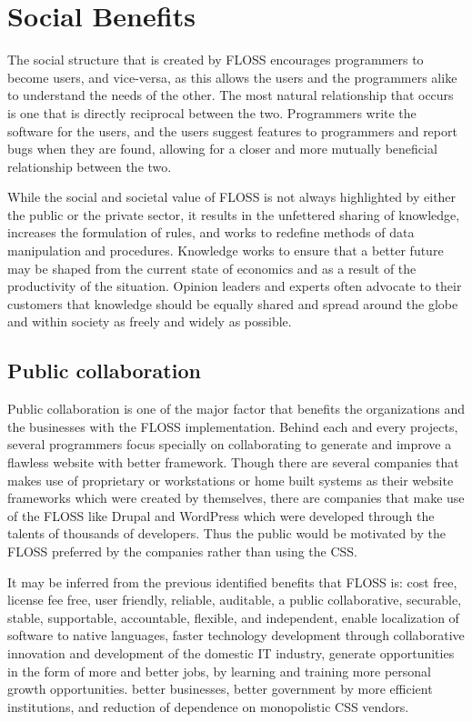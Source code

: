   \section{Social Benefits }
  The social structure that is created by FLOSS encourages programmers to become users, and vice-versa, as this allows the users and the programmers alike to understand the needs of the other. The most natural relationship that occurs is one that is directly reciprocal between the two. Programmers write the software for the users, and the users suggest features to programmers and report bugs when they are found, allowing for a closer and more mutually beneficial relationship between the two.
  
  While the social and societal value of FLOSS is not always highlighted by either the public or the private sector, it results in the unfettered sharing of knowledge, increases the formulation of rules, and works to redefine methods of data manipulation and procedures. Knowledge works to ensure that a better future may be shaped from the current state of economics and as a result of the productivity of the situation. Opinion leaders and experts often advocate to their customers that knowledge should be equally shared and spread around the globe and within society as freely and widely as possible.
  
  \subsection{Public collaboration}
  Public collaboration is one of the major factor that benefits the organizations and the businesses with the FLOSS implementation. Behind each and every projects, several programmers focus specially on collaborating to generate and improve a flawless website with better framework. Though there are several companies that makes use of proprietary or workstations or home built systems as their website frameworks which were created by themselves, there are companies that make use of the FLOSS like Drupal and WordPress which were developed through the talents of thousands of developers. Thus the public would be motivated by the FLOSS preferred by the companies rather than using the CSS.
  \newline

  
  It may be inferred from the previous identified benefits that FLOSS is: cost free, license fee free, user friendly, reliable, auditable, a public collaborative, securable, stable, supportable, accountable, flexible, and independent, enable localization of software to native languages, faster technology development through collaborative innovation and development of the domestic IT industry, generate opportunities in the form of more and better jobs, by learning and training more personal growth opportunities. better businesses, better government by more efficient institutions, and reduction of dependence on monopolistic CSS vendors.
  
